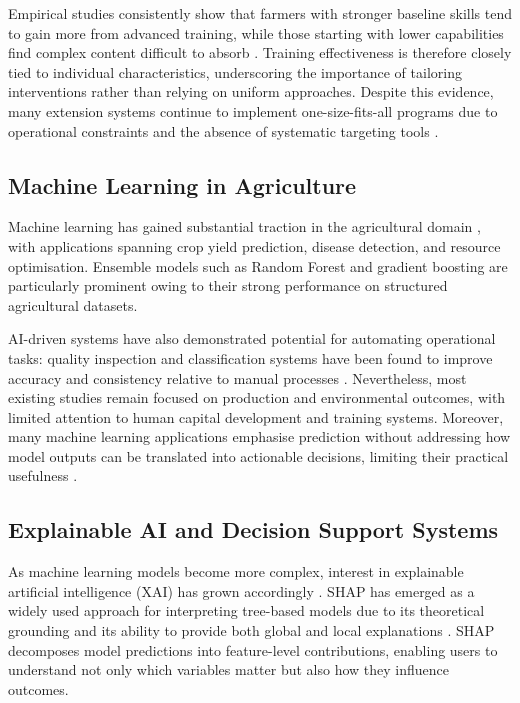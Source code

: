 \documentclass[3p,twocolumn,authoryear]{elsarticle}
\begin{document}
Empirical studies consistently show that farmers with stronger
baseline skills tend to gain more from advanced training, while
those starting with lower capabilities find complex content
difficult to absorb \citep{davis2012}.
Training effectiveness is therefore closely tied to individual
characteristics, underscoring the importance of tailoring
interventions rather than relying on uniform approaches.
Despite this evidence, many extension systems continue to implement
one-size-fits-all programs due to operational constraints and the
absence of systematic targeting tools \citep{anderson2004}.

\subsection{Machine Learning in Agriculture}

Machine learning has gained substantial traction in the agricultural
domain \citep{kamilaris2018,liakos2018}, with applications spanning
crop yield prediction, disease detection, and resource optimisation.
Ensemble models such as Random Forest and gradient boosting are
particularly prominent owing to their strong performance on
structured agricultural datasets.

AI-driven systems have also demonstrated potential for automating
operational tasks: quality inspection and classification systems
have been found to improve accuracy and consistency relative to
manual processes \citep{wonggasem2024}.
Nevertheless, most existing studies remain focused on production and
environmental outcomes, with limited attention to human capital
development and training systems.
Moreover, many machine learning applications emphasise prediction
without addressing how model outputs can be translated into
actionable decisions, limiting their practical usefulness
\citep{ryo2022}.

\subsection{Explainable AI and Decision Support Systems}

As machine learning models become more complex, interest in
explainable artificial intelligence (XAI) has grown accordingly
\citep{arrieta2020,lipton2018}.
SHAP has emerged as a widely used approach for interpreting
tree-based models due to its theoretical grounding and its ability
to provide both global and local explanations \citep{lundberg2017}.
SHAP decomposes model predictions into feature-level contributions,
enabling users to understand not only which variables matter but
also how they influence outcomes.
\end{document}

